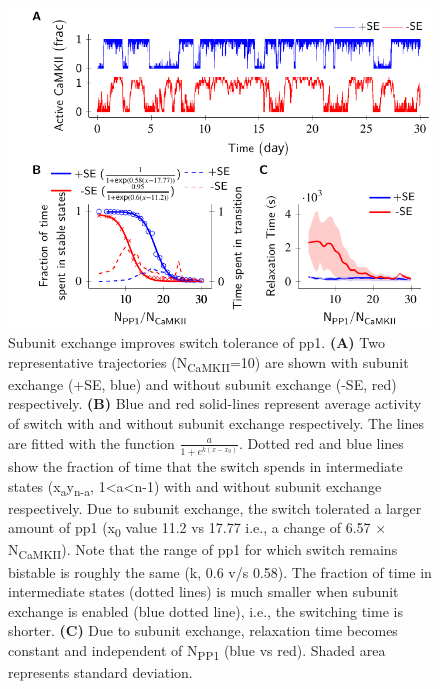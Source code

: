 \documentclass[9pt,lineno,doublespacing]{elife}
\newcommand\SUB[2]{#1\textsubscript{#2}}
\begin{document}
\begin{figure}
    \includegraphics[width=112mm]{PaperFigures/elifeFigure2/figure_effect_of_tolerace_114mm.pdf}
    \caption{Subunit exchange improves switch tolerance of \gls{pp1}.
        \textbf{(A)} Two representative trajectories (\SUB{N}{CaMKII}=10) are
        shown with subunit exchange (+SE, blue) and without
        subunit exchange (-SE, red) respectively. \textbf{(B)} Blue and red
        solid-lines represent average activity of switch with and without 
        subunit exchange respectively. The lines are fitted with the 
        function \(\frac{a}{1+e^{k(x-x_0)}}\).
        Dotted red and blue lines show the fraction of time that the switch
        spends in intermediate states (\SUB{x}{a}\SUB{y}{n-a}, 1<a<n-1) with
        and without subunit exchange respectively. Due to subunit exchange,
        the switch tolerated a larger amount of \gls{pp1} 
        (\SUB{x}{0} value 11.2 vs 17.77 i.e., a change of 6.57 $\times$ 
        \SUB{N}{CaMKII}). Note that the range 
        of \gls{pp1} for which switch remains bistable is roughly the 
        same (k, 0.6 v/s 0.58). The fraction of time in intermediate states (dotted lines)
	is much smaller when subunit exchange is enabled (blue dotted line),
        i.e., the switching time is shorter. \textbf{(C)} Due to subunit exchange, relaxation 
        time becomes constant and independent of \SUB{N}{PP1} (blue vs red). 
        Shaded area represents standard deviation.
    }\label{fig:tolerance_pp1}
\end{figure}
\end{document}
